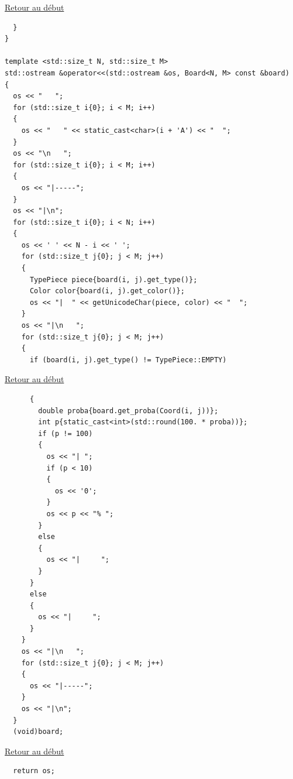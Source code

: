 {\begin{frame}[fragile]
\hyperlink{conclusion}{Retour au début}\newline
\begin{verbatim}
  }
}

template <std::size_t N, std::size_t M>
std::ostream &operator<<(std::ostream &os, Board<N, M> const &board)
{
  os << "   ";
  for (std::size_t i{0}; i < M; i++)
  {
    os << "   " << static_cast<char>(i + 'A') << "  ";
  }
  os << "\n   ";
  for (std::size_t i{0}; i < M; i++)
  {
    os << "|-----";
  }
  os << "|\n";
  for (std::size_t i{0}; i < N; i++)
  {
    os << ' ' << N - i << ' ';
    for (std::size_t j{0}; j < M; j++)
    {
      TypePiece piece{board(i, j).get_type()};
      Color color{board(i, j).get_color()};
      os << "|  " << getUnicodeChar(piece, color) << "  ";
    }
    os << "|\n   ";
    for (std::size_t j{0}; j < M; j++)
    {
      if (board(i, j).get_type() != TypePiece::EMPTY)
\end{verbatim}
\end{frame}

\begin{frame}[fragile]
\hyperlink{conclusion}{Retour au début}\newline
\begin{verbatim}
      {
        double proba{board.get_proba(Coord(i, j))};
        int p{static_cast<int>(std::round(100. * proba))};
        if (p != 100)
        {
          os << "| ";
          if (p < 10)
          {
            os << '0';
          }
          os << p << "% ";
        }
        else
        {
          os << "|     ";
        }
      }
      else
      {
        os << "|     ";
      }
    }
    os << "|\n   ";
    for (std::size_t j{0}; j < M; j++)
    {
      os << "|-----";
    }
    os << "|\n";
  }
  (void)board;
\end{verbatim}
\end{frame}

\begin{frame}[fragile]
\hyperlink{conclusion}{Retour au début}\newline
\begin{verbatim}
  return os;

\end{verbatim}
\end{frame}

}
